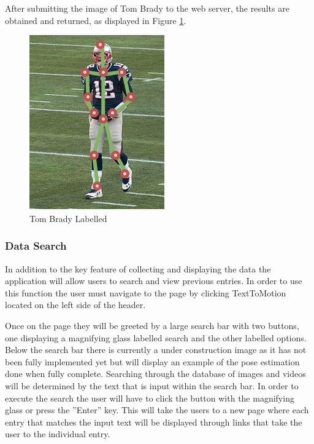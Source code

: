 \documentclass{scrreprt}
\begin{document}
After submitting the image of Tom Brady to the web server, the results are
obtained and returned, as displayed in Figure \ref{fig:labelledBrady}.

\begin{figure}
        \includegraphics[width=\linewidth]{tbradylabelled.jpg}
  \caption{Tom Brady Labelled}
  \label{fig:labelledBrady}
\end{figure}

\FloatBarrier

\subsubsection{Data Search}

In addition to the key feature of collecting and displaying the data the
application will allow users to search and view previous entries. In order to
use this function the user must navigate to the page by clicking TextToMotion
located on the left side of the header.

Once on the page they will be greeted by a large search bar with two buttons,
one displaying a magnifying glass labelled search and the other labelled
options. Below the search bar there is currently a under construction image as
it has not been fully implemented yet but will display an example of the pose
estimation done when fully complete. Searching through the database of images
and videos will be determined by the text that is input within the search bar.
In order to execute the search the user will have to click the button with the
magnifying glass or press the ''Enter'' key. This will take the users to a new
page where each entry that matches the input text will be displayed through
links that take the user to the individual entry.
\end{document}

